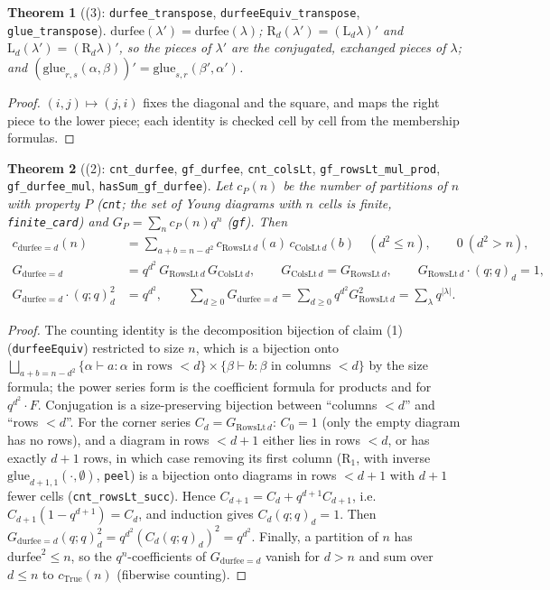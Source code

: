 \documentclass[11pt]{article}
\newtheorem{theorem}{Theorem}
\theoremstyle{definition}
\newcommand{\Rt}{\mathrm{R}}
\newcommand{\Lw}{\mathrm{L}}
\begin{document}
\begin{theorem}[(3): \texttt{durfee\_transpose}, \texttt{durfeeEquiv\_transpose},
\texttt{glue\_transpose}]
$\mathrm{durfee}(\lambda')=\mathrm{durfee}(\lambda)$; $\Rt_d(\lambda')=(\Lw_d\lambda)'$ and
$\Lw_d(\lambda')=(\Rt_d\lambda)'$, so the pieces of $\lambda'$ are the conjugated, exchanged
pieces of $\lambda$; and $(\mathrm{glue}_{r,s}(\alpha,\beta))'=\mathrm{glue}_{s,r}(\beta',\alpha')$.
\end{theorem}
\begin{proof}
$(i,j)\mapsto(j,i)$ fixes the diagonal and the square, and maps the right piece to the lower piece;
each identity is checked cell by cell from the membership formulas.
\end{proof}

\begin{theorem}[(2): \texttt{cnt\_durfee}, \texttt{gf\_durfee}, \texttt{cnt\_colsLt},
\texttt{gf\_rowsLt\_mul\_prod}, \texttt{gf\_durfee\_mul}, \texttt{hasSum\_gf\_durfee}]
Let $c_P(n)$ be the number of partitions of $n$ with property $P$ (\texttt{cnt}; the set of Young
diagrams with $n$ cells is finite, \texttt{finite\_card}) and $G_P=\sum_n c_P(n)q^n$
(\texttt{gf}). Then
\begin{align*}
c_{\mathrm{durfee}=d}(n)&=\textstyle\sum_{a+b=n-d^2} c_{\mathrm{RowsLt}\,d}(a)\,c_{\mathrm{ColsLt}\,d}(b)
 \quad(d^2\le n),\qquad 0\ (d^2>n),\\
G_{\mathrm{durfee}=d}&=q^{d^2}\,G_{\mathrm{RowsLt}\,d}\,G_{\mathrm{ColsLt}\,d},\qquad
G_{\mathrm{ColsLt}\,d}=G_{\mathrm{RowsLt}\,d},\qquad G_{\mathrm{RowsLt}\,d}\cdot(q;q)_d=1,\\
G_{\mathrm{durfee}=d}\cdot(q;q)_d^2&=q^{d^2},\qquad
\textstyle\sum_{d\ge0}G_{\mathrm{durfee}=d}=\sum_{d\ge 0}q^{d^2}G_{\mathrm{RowsLt}\,d}^2=\sum_\lambda q^{|\lambda|}.
\end{align*}
\end{theorem}
\begin{proof}
The counting identity is the decomposition bijection of claim (1) (\texttt{durfeeEquiv}) restricted
to size $n$, which is a bijection onto
$\bigsqcup_{a+b=n-d^2}\{\alpha\vdash a : \alpha \text{ in rows } <d\}\times\{\beta\vdash b : \beta \text{ in columns } <d\}$
by the size formula; the
power series form is the coefficient formula for products and for $q^{d^2}\cdot F$. Conjugation is
a size-preserving bijection between ``columns $<d$'' and ``rows $<d$''. For the corner series
$C_d=G_{\mathrm{RowsLt}\,d}$: $C_0=1$ (only the empty diagram has no rows), and a diagram in rows
$<d+1$ either lies in rows $<d$, or has exactly $d+1$ rows, in which case removing its first column
($\Rt_1$, with inverse $\mathrm{glue}_{d+1,1}(\cdot,\emptyset)$, \texttt{peel}) is a bijection
onto diagrams in rows $<d+1$ with $d+1$ fewer cells (\texttt{cnt\_rowsLt\_succ}). Hence
$C_{d+1}=C_d+q^{d+1}C_{d+1}$, i.e.\ $C_{d+1}(1-q^{d+1})=C_d$, and induction gives
$C_d(q;q)_d=1$. Then $G_{\mathrm{durfee}=d}(q;q)_d^2=q^{d^2}(C_d(q;q)_d)^2=q^{d^2}$. Finally, a
partition of $n$ has $\mathrm{durfee}^2\le n$, so the $q^n$-coefficients of $G_{\mathrm{durfee}=d}$
vanish for $d>n$ and sum over $d\le n$ to $c_{\mathrm{True}}(n)$ (fiberwise counting).
\end{proof}
\end{document}
